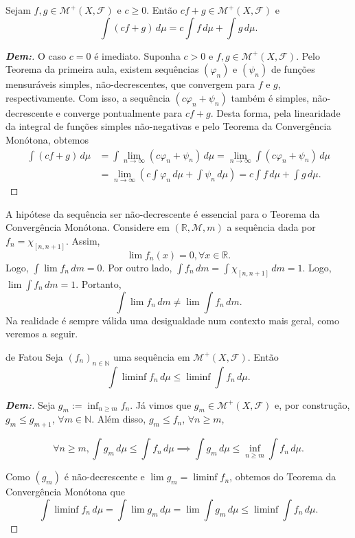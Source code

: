 \begin{corollary*}{}
Sejam $f, g \in \mathcal{M}^+(X, \mathcal{F})$ e $c \ge 0$. Então $cf + g \in \mathcal{M}^+(X, \mathcal{F})$ e 
$$ \int (cf + g) \, d\mu = c \int f \, d\mu + \int g \, d\mu. $$
\end{corollary*}

\begin{proof}[\textbf{Dem:}]
O caso $c = 0$ é imediato. Suponha $c > 0$ e $f, g \in \mathcal{M}^+(X, \mathcal{F})$. Pelo Teorema da primeira aula, existem sequências $(\varphi_n)$ e $(\psi_n)$ de funções mensuráveis simples, não-decrescentes, que convergem para $f$ e $g$, respectivamente. 
Com isso, a sequência $(c\varphi_n + \psi_n)$ também é simples, não-decrescente e converge pontualmente para $cf + g$. 
Desta forma, pela linearidade da integral de funções simples não-negativas e pelo Teorema da Convergência Monótona, obtemos
  \begin{align*}
  \int (cf + g) \, d\mu &= \int \lim_{n \to \infty} (c\varphi_n + \psi_n) \, d\mu = 
  \lim_{n \to \infty} \int (c\varphi_n + \psi_n) \, d\mu\\
  &=
  \lim_{n \to \infty} \left( c\int \varphi_n \, d\mu + \int \psi_n \, d\mu \right)
  = c\int f \, d\mu + \int g \, d\mu.   
  \end{align*}
\end{proof}
\bigline

A hipótese da sequência ser não-decrescente é essencial para o Teorema da Convergência Monótona.
Considere em $(\mathbb{R}, \mathcal{M}, m)$ a sequência dada por $f_n = \chi_{[n, n+1]}$. Assim, $$\lim f_n(x) = 0, \forall x \in \mathbb{R}.$$ Logo, $\int \lim f_n \, dm = 0$.
Por outro lado, $\int f_n \, dm = \int \chi_{[n, n+1]} \, dm = 1$. Logo, $\lim \int f_n \, dm = 1$. Portanto,
$$ \int \lim f_n \, dm \neq \lim \int f_n \, dm. $$
Na realidade é sempre válida uma desigualdade num contexto mais geral, como veremos a 
seguir.

\begin{lemma*}{ de Fatou}
Seja $(f_n)_{n \in \mathbb{N}}$ uma sequência em $\mathcal{M}^+(X, \mathcal{F})$. Então
$$ \int \liminf f_n \, d\mu \le \liminf \int f_n \, d\mu. $$
\end{lemma*}

\begin{proof}[\textbf{Dem:}]
Seja $g_m := \inf_{n \ge m} f_n$. Já vimos que $g_m \in \mathcal{M}^+(X, \mathcal{F})$ e, por construção, $g_m \le g_{m+1}$, $\forall m \in \mathbb{N}$. 
Além disso, $g_m \le f_n$, $\forall n \ge m$,

  $$\forall n \ge m, \int g_m \, d\mu \le \int f_n \, d\mu 
  \implies \int g_m \, d\mu \le \inf_{n \ge m} \int f_n \, d\mu.$$

Como $(g_m)$ é não-decrescente e $\lim g_m = \liminf f_n$, obtemos do Teorema da Convergência Monótona que
$$ \int \liminf f_n \, d\mu = \int \lim g_m \, d\mu = \lim \int g_m \, d\mu \le \liminf \int f_n \, d\mu. $$
\end{proof}

